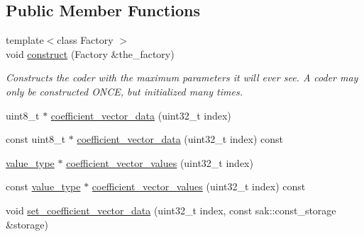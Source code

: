 \subsection*{Public Member Functions}
\begin{DoxyCompactItemize}
\item 
{\footnotesize template$<$class Factory $>$ }\\void \hyperlink{classkodo_1_1coefficient__storage_a0c97957527612312514614c2979d8b0f}{construct} (Factory \&the\-\_\-factory)
\begin{DoxyCompactList}\small\item\em Constructs the coder with the maximum parameters it will ever see. A coder may only be constructed O\-N\-C\-E, but initialized many times. \end{DoxyCompactList}\item 
uint8\-\_\-t $\ast$ \hyperlink{classkodo_1_1coefficient__storage_a5bba503ebcd0add0227fe229c0cfb17d}{coefficient\-\_\-vector\-\_\-data} (uint32\-\_\-t index)
\begin{DoxyCompactList}\small\item\em \end{DoxyCompactList}\item 
const uint8\-\_\-t $\ast$ \hyperlink{classkodo_1_1coefficient__storage_aab676932c228f2d5130862d561f7dc2c}{coefficient\-\_\-vector\-\_\-data} (uint32\-\_\-t index) const 
\begin{DoxyCompactList}\small\item\em \end{DoxyCompactList}\item 
\hyperlink{classkodo_1_1coefficient__storage_a20cb74e084e77c6c15b176e01f555b1c}{value\-\_\-type} $\ast$ \hyperlink{classkodo_1_1coefficient__storage_aef59349a3470567c5820d1081412eb49}{coefficient\-\_\-vector\-\_\-values} (uint32\-\_\-t index)
\begin{DoxyCompactList}\small\item\em \end{DoxyCompactList}\item 
const \hyperlink{classkodo_1_1coefficient__storage_a20cb74e084e77c6c15b176e01f555b1c}{value\-\_\-type} $\ast$ \hyperlink{classkodo_1_1coefficient__storage_a8f49fd662f444cb4d8d090c0492a9315}{coefficient\-\_\-vector\-\_\-values} (uint32\-\_\-t index) const 
\begin{DoxyCompactList}\small\item\em \end{DoxyCompactList}\item 
void \hyperlink{classkodo_1_1coefficient__storage_a89482331c9b5058a6a910dc083d46ab0}{set\-\_\-coefficient\-\_\-vector\-\_\-data} (uint32\-\_\-t index, const sak\-::const\-\_\-storage \&storage)
\begin{DoxyCompactList}\small\item\em \end{DoxyCompactList}\end{DoxyCompactItemize}


